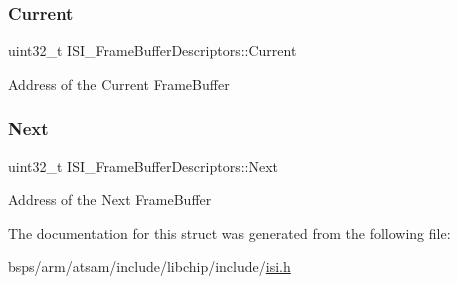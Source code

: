 \subsubsection{\texorpdfstring{Current}{Current}}
{\footnotesize\ttfamily uint32\+\_\+t I\+S\+I\+\_\+\+Frame\+Buffer\+Descriptors\+::\+Current}

Address of the Current Frame\+Buffer \mbox{\label{structISI__FrameBufferDescriptors_a36f356786e6d04f5eb34c7240cfe4300}} 
\subsubsection{\texorpdfstring{Next}{Next}}
{\footnotesize\ttfamily uint32\+\_\+t I\+S\+I\+\_\+\+Frame\+Buffer\+Descriptors\+::\+Next}

Address of the Next Frame\+Buffer 

The documentation for this struct was generated from the following file\+:\begin{DoxyCompactItemize}
\item 
bsps/arm/atsam/include/libchip/include/\mbox{\hyperlink{isi_8h}{isi.\+h}}\end{DoxyCompactItemize}
